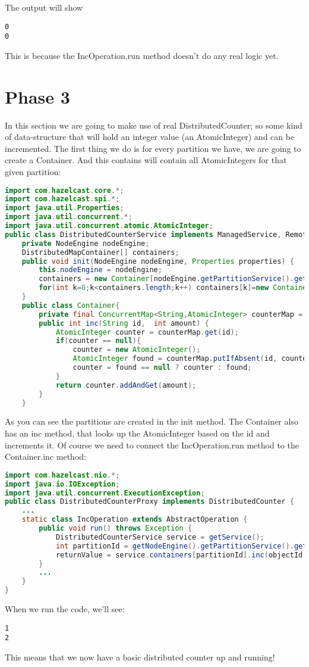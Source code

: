 The output will show
\begin{lstlisting}
0
0
\end{lstlisting}
This is because the IncOperation.run method doesn't do any real logic yet.

\section{Phase 3}
In this section we are going to make use of real DistributedCounter; so some kind of data-structure that will hold an integer value (an AtomicInteger) and can be incremented. The first thing we do is for every partition we have, we are going to create a Container. And this contains will contain all AtomicIntegers for that given partition:
\begin{lstlisting}[language=java]
import com.hazelcast.core.*;
import com.hazelcast.spi.*;
import java.util.Properties;
import java.util.concurrent.*;
import java.util.concurrent.atomic.AtomicInteger;
public class DistributedCounterService implements ManagedService, RemoteService {
    private NodeEngine nodeEngine;
    DistributedMapContainer[] containers;
    public void init(NodeEngine nodeEngine, Properties properties) {
        this.nodeEngine = nodeEngine;
        containers = new Container[nodeEngine.getPartitionService().getPartitionCount()];
        for(int k=0;k<containers.length;k++) containers[k]=new Container();
    }
    public class Container{
        private final ConcurrentMap<String,AtomicInteger> counterMap = new ConcurrentHashMap<>();
        public int inc(String id,  int amount) {
            AtomicInteger counter = counterMap.get(id);
            if(counter == null){
                counter = new AtomicInteger();
                AtomicInteger found = counterMap.putIfAbsent(id, counter);
                counter = found == null ? counter : found;
            }
            return counter.addAndGet(amount);
        }
    }
\end{lstlisting}
As you can see the partitions are created in the init method. The Container also has an inc method, that looks up the AtomicInteger based on the id and increments it. Of course we need to connect the IncOperation.run method to the Container.inc method:
\begin{lstlisting}[language=java]
import com.hazelcast.nio.*;
import java.io.IOException;
import java.util.concurrent.ExecutionException;
public class DistributedCounterProxy implements DistributedCounter {
    ... 
    static class IncOperation extends AbstractOperation {
        public void run() throws Exception {
            DistributedCounterService service = getService();
            int partitionId = getNodeEngine().getPartitionService().getPartitionId(objectId);
            returnValue = service.containers[partitionId].inc(objectId, amount);
        }
        ...
    }
}
\end{lstlisting}
When we run the code, we'll see:
\begin{lstlisting}
1
2
\end{lstlisting}
This means that we now have a basic distributed counter up and running!

